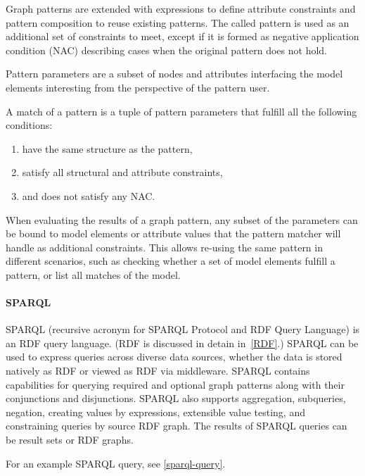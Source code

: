 Graph patterns are extended with expressions to define attribute constraints and
pattern composition to reuse existing patterns. The called pattern is used as
an additional set of constraints to meet, except if it is formed as negative
application condition (NAC) describing cases when the original pattern does not hold.

Pattern parameters are a subset of nodes and attributes interfacing the
model elements interesting from the perspective of the pattern user.

A match of a pattern is a tuple of pattern parameters that fulfill all the following conditions:

\begin{enumerate}
	\item have the same structure as the pattern,
	\item satisfy all structural and attribute constraints,
	\item and does not satisfy any NAC.
\end{enumerate}

When evaluating the results of a graph pattern, any subset of the parameters
can be bound to model elements or attribute values that the pattern matcher
will handle as additional constraints. This allows re-using the same pattern
in different scenarios, such as checking whether a set of model elements
fulfill a pattern, or list all matches of the model.

\paragraph{SPARQL}
\label{sect:sparql}
SPARQL (recursive acronym for SPARQL Protocol and RDF Query Language) is an RDF query language. (RDF is discussed in detain in~\ref{RDF}.) SPARQL can be used to express queries across diverse data sources, whether the data is stored natively as RDF or viewed as RDF via middleware. SPARQL contains capabilities for querying required and optional graph patterns along with their conjunctions and disjunctions. SPARQL also supports aggregation, subqueries, negation, creating values by expressions, extensible value testing, and constraining queries by source RDF graph. The results of SPARQL queries can be result sets or RDF graphs.~\cite{W3C-SPARQL,Harris:13:SQL}

For an example SPARQL query, see \ref{sparql-query}.

